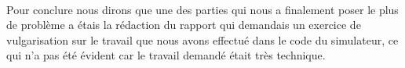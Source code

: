 \documentclass[12pt]{article}
\begin{document}
\paragraph{} Pour conclure nous dirons que une des parties qui nous a finalement poser le plus de problème a étais la rédaction du rapport qui demandais un exercice de vulgarisation sur le travail que nous avons effectué dans le code du simulateur, ce qui n'a pas été évident car le travail demandé était très technique.
\end{document}
